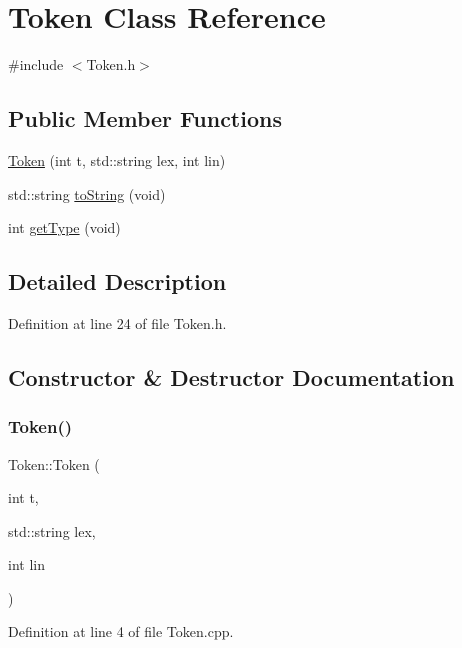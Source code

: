 \hypertarget{classToken}{}\section{Token Class Reference}
\label{classToken}


{\ttfamily \#include $<$Token.\+h$>$}

\subsection*{Public Member Functions}
\begin{DoxyCompactItemize}
\item 
\hyperlink{classToken_a05effe0dad273695350ae4dd90eec4fc}{Token} (int t, std\+::string lex, int lin)
\item 
std\+::string \hyperlink{classToken_ac5f72b7408cc16946d166963cf1f288d}{to\+String} (void)
\item 
int \hyperlink{classToken_a7ca73dbe9c27e2663f846293aeaff59c}{get\+Type} (void)
\end{DoxyCompactItemize}


\subsection{Detailed Description}


Definition at line 24 of file Token.\+h.



\subsection{Constructor \& Destructor Documentation}
\mbox{\label{classToken_a05effe0dad273695350ae4dd90eec4fc}} 
\subsubsection{\texorpdfstring{Token()}{Token()}}
{\footnotesize\ttfamily Token\+::\+Token (\begin{DoxyParamCaption}\item[{int}]{t,  }\item[{std\+::string}]{lex,  }\item[{int}]{lin }\end{DoxyParamCaption})}



Definition at line 4 of file Token.\+cpp.



